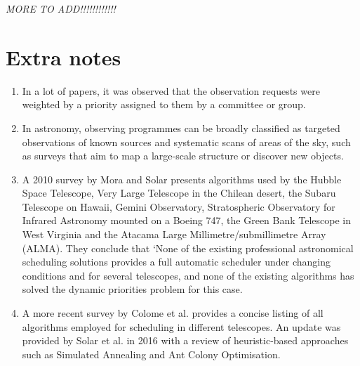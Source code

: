 \documentclass{article}
\begin{document}
\textit{MORE TO ADD!!!!!!!!!!!!}

\section*{Extra notes}
\begin{enumerate}
    \item In a lot of papers, it was observed that the observation requests were weighted by a priority assigned to them by a committee or group.
    \item In astronomy, observing programmes can be broadly classified as targeted observations of known sources and systematic scans of areas of the sky, such as surveys that
    aim to map a large-scale structure or discover new objects.
    \item A 2010 survey by Mora and Solar \cite{mora2010survey} presents algorithms used by the Hubble
    Space Telescope, Very Large Telescope in the Chilean desert, the Subaru Telescope
    on Hawaii, Gemini Observatory, Stratospheric Observatory for Infrared Astronomy
    mounted on a Boeing 747, the Green Bank Telescope in West Virginia and the Atacama Large Millimetre/submillimetre Array (ALMA). They conclude that ‘None of
    the existing professional astronomical scheduling solutions provides a full automatic
    scheduler under changing conditions and for several telescopes, and none of the
    existing algorithms has solved the dynamic priorities problem for this case.
    \item A more recent survey by Colome et al. \cite{colome2012research} provides a concise listing of all algorithms employed for scheduling in different telescopes. An update was provided
    by Solar et al. \cite{solar2016scheduling} in 2016 with a review of heuristic-based approaches such as
    Simulated Annealing and Ant Colony Optimisation.
\end{enumerate}

\printbibliography
\end{document}
